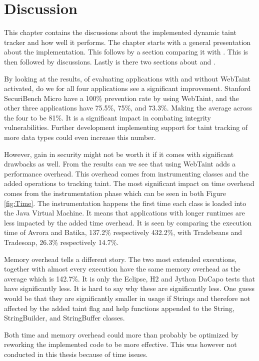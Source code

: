 \chapter{Discussion}
This chapter contains the discussions about the implemented dynamic taint tracker and how well it performs. The chapter starts with a general presentation about the implementation. This follows by a section comparing it with \textit{}. This is then followed by \textit{} discussions. Lastly is there two sections about \textit{} and \textit{}.

By looking at the results, of evaluating applications with and without WebTaint activated, do we for all four applications see a significant improvement. Stanford SecuriBench Micro have a 100\% prevention rate by using WebTaint, and the other three applications have 75.5\%, 75\%, and 73.3\%. Making the average across the four to be 81\%. It is a significant impact in combating integrity vulnerabilities. Further development implementing support for taint tracking of more data types could even increase this number.

However, gain in security might not be worth it if it comes with significant drawbacks as well. From the results can we see that using WebTaint adds a performance overhead. This overhead comes from instrumenting classes and the added operations to tracking taint. The most significant impact on time overhead comes from the instrumentation phase which can be seen in both Figure \ref{fig:Time}. The instrumentation happens the first time each class is loaded into the Java Virtual Machine. It means that applications with longer runtimes are less impacted by the added time overhead. It is seen by comparing the execution time of Avrora and Batika, 137.2\% respectively 432.2\%, with Tradebeans and Tradesoap, 26.3\% respectively 14.7\%.

Memory overhead tells a different story. The two most extended executions, together with almost every execution have the same memory overhead as the average which is 142.7\%. It is only the Eclipse, H2 and Jython DaCapo tests that have significantly less. It is hard to say why these are significantly less. One guess would be that they are significantly smaller in usage if Strings and therefore not affected by the added taint flag and help functions appended to the String, StringBuilder, and StringBuffer classes.

Both time and memory overhead could more than probably be optimized by reworking the implemented code to be more effective. This was however not conducted in this thesis because of time issues.

